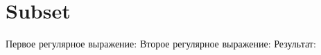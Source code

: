 \section{Subset}
\begin{frame}{}
	Первое регулярное выражение:
	Второе регулярное выражение:
	Результат:
\end{frame}
